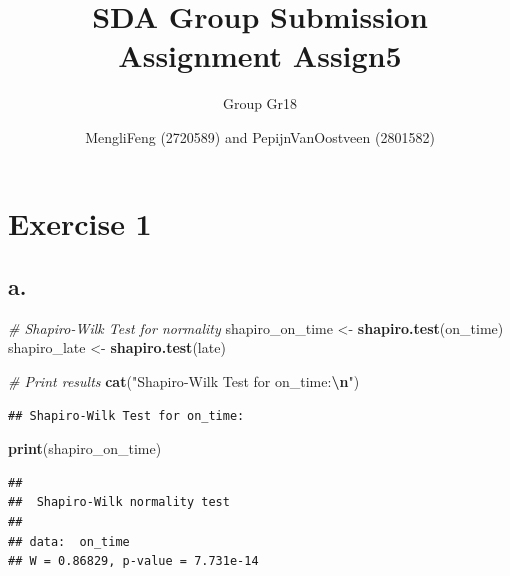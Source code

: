 \documentclass[
]{article}
\title{SDA Group Submission Assignment Assign5}
\subtitle{Group Gr18}
\author{MengliFeng (2720589) and PepijnVanOostveen (2801582)}
\date{}
\newenvironment{Shaded}{\begin{snugshade}}{\end{snugshade}}
\newcommand{\CommentTok}[1]{\textcolor[rgb]{0.56,0.35,0.01}{\textit{#1}}}
\newcommand{\FunctionTok}[1]{\textcolor[rgb]{0.13,0.29,0.53}{\textbf{#1}}}
\newcommand{\NormalTok}[1]{#1}
\newcommand{\OtherTok}[1]{\textcolor[rgb]{0.56,0.35,0.01}{#1}}
\newcommand{\SpecialCharTok}[1]{\textcolor[rgb]{0.81,0.36,0.00}{\textbf{#1}}}
\newcommand{\StringTok}[1]{\textcolor[rgb]{0.31,0.60,0.02}{#1}}
\begin{document}
\maketitle

\section{Exercise 1}\label{exercise-1}

\begin{Shaded}
\end{Shaded}

\subsection{a.}\label{a.}

\begin{Shaded}
\begin{Highlighting}[]
\CommentTok{\# Shapiro{-}Wilk Test for normality}
\NormalTok{shapiro\_on\_time }\OtherTok{\textless{}{-}} \FunctionTok{shapiro.test}\NormalTok{(on\_time)}
\NormalTok{shapiro\_late }\OtherTok{\textless{}{-}} \FunctionTok{shapiro.test}\NormalTok{(late)}

\CommentTok{\# Print results}
\FunctionTok{cat}\NormalTok{(}\StringTok{"Shapiro{-}Wilk Test for on\_time:}\SpecialCharTok{\textbackslash{}n}\StringTok{"}\NormalTok{)}
\end{Highlighting}
\end{Shaded}

\begin{verbatim}
## Shapiro-Wilk Test for on_time:
\end{verbatim}

\begin{Shaded}
\begin{Highlighting}[]
\FunctionTok{print}\NormalTok{(shapiro\_on\_time)}
\end{Highlighting}
\end{Shaded}

\begin{verbatim}
## 
##  Shapiro-Wilk normality test
## 
## data:  on_time
## W = 0.86829, p-value = 7.731e-14
\end{verbatim}
\end{document}
